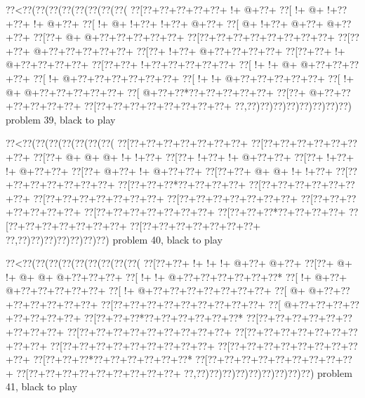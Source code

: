 \vbox{\vbox{\goo
\0??<\0??(\0??(\0??(\0??(\0??(\0??(\0??(\0??(
\0??[\0??+\0??+\0??+\0??+\0??+\- !+\- @+\0??+
\0??[\- !+\- @+\- !+\0??+\0??+\- !+\- @+\0??+
\0??[\- !+\- @+\- !+\0??+\- !+\0??+\- @+\0??+
\0??[\- @+\- !+\0??+\- @+\0??+\- @+\0??+\0??+
\0??[\0??+\- @+\- @+\0??+\0??+\0??+\0??+\0??+
\0??[\0??+\0??+\0??+\0??+\0??+\0??+\0??+\0??+
\0??[\0??+\0??+\- @+\0??+\0??+\0??+\0??+\0??+
\0??[\0??+\- !+\0??+\- @+\0??+\0??+\0??+\0??+
\0??[\0??+\0??+\- !+\- @+\0??+\0??+\0??+\0??+
\0??[\0??+\0??+\- !+\0??+\0??+\0??+\0??+\0??+
\0??[\- !+\- !+\- @+\- @+\0??+\0??+\0??+\0??+
\0??[\- !+\- @+\0??+\0??+\0??+\0??+\0??+\0??+
\0??[\- !+\- !+\- @+\0??+\0??+\0??+\0??+\0??+
\0??[\- !+\- @+\- @+\0??+\0??+\0??+\0??+\0??+
\0??[\- @+\0??+\0??*\0??+\0??+\0??+\0??+\0??+
\0??[\0??+\- @+\0??+\0??+\0??+\0??+\0??+\0??+
\0??[\0??+\0??+\0??+\0??+\0??+\0??+\0??+\0??+
\0??,\0??)\0??)\0??)\0??)\0??)\0??)\0??)\0??)
}
\hfil problem 39, black to play\hfil\break
}

\vbox{\vbox{\goo
\0??<\0??(\0??(\0??(\0??(\0??(\0??(\0??(
\0??[\0??+\0??+\0??+\0??+\0??+\0??+\0??+
\0??[\0??+\0??+\0??+\0??+\0??+\0??+\0??+
\0??[\0??+\- @+\- @+\- @+\- !+\- !+\0??+
\0??[\0??+\- !+\0??+\- !+\- @+\0??+\0??+
\0??[\0??+\- !+\0??+\- !+\- @+\0??+\0??+
\0??[\0??+\- @+\0??+\- !+\- @+\0??+\0??+
\0??[\0??+\0??+\- @+\- @+\- !+\- !+\0??+
\0??[\0??+\0??+\0??+\0??+\0??+\0??+\0??+
\0??[\0??+\0??+\0??*\0??+\0??+\0??+\0??+
\0??[\0??+\0??+\0??+\0??+\0??+\0??+\0??+
\0??[\0??+\0??+\0??+\0??+\0??+\0??+\0??+
\0??[\0??+\0??+\0??+\0??+\0??+\0??+\0??+
\0??[\0??+\0??+\0??+\0??+\0??+\0??+\0??+
\0??[\0??+\0??+\0??+\0??+\0??+\0??+\0??+
\0??[\0??+\0??+\0??*\0??+\0??+\0??+\0??+
\0??[\0??+\0??+\0??+\0??+\0??+\0??+\0??+
\0??[\0??+\0??+\0??+\0??+\0??+\0??+\0??+
\0??,\0??)\0??)\0??)\0??)\0??)\0??)\0??)
}
\hfil problem 40, black to play\hfil\break
}

\vbox{\vbox{\goo
\0??<\0??(\0??(\0??(\0??(\0??(\0??(\0??(\0??(\0??(
\0??[\0??+\0??+\- !+\- !+\- !+\- @+\0??+\- @+\0??+
\0??[\0??+\- @+\- !+\- @+\- @+\- @+\0??+\0??+\0??+
\0??[\- !+\- !+\- @+\0??+\0??+\0??+\0??+\0??+\0??*
\0??[\- !+\- @+\0??+\- @+\0??+\0??+\0??+\0??+\0??+
\0??[\- !+\- @+\0??+\0??+\0??+\0??+\0??+\0??+\0??+
\0??[\- @+\- @+\0??+\0??+\0??+\0??+\0??+\0??+\0??+
\0??[\0??+\0??+\0??+\0??+\0??+\0??+\0??+\0??+\0??+
\0??[\- @+\0??+\0??+\0??+\0??+\0??+\0??+\0??+\0??+
\0??[\0??+\0??+\0??*\0??+\0??+\0??+\0??+\0??+\0??*
\0??[\0??+\0??+\0??+\0??+\0??+\0??+\0??+\0??+\0??+
\0??[\0??+\0??+\0??+\0??+\0??+\0??+\0??+\0??+\0??+
\0??[\0??+\0??+\0??+\0??+\0??+\0??+\0??+\0??+\0??+
\0??[\0??+\0??+\0??+\0??+\0??+\0??+\0??+\0??+\0??+
\0??[\0??+\0??+\0??+\0??+\0??+\0??+\0??+\0??+\0??+
\0??[\0??+\0??+\0??*\0??+\0??+\0??+\0??+\0??+\0??*
\0??[\0??+\0??+\0??+\0??+\0??+\0??+\0??+\0??+\0??+
\0??[\0??+\0??+\0??+\0??+\0??+\0??+\0??+\0??+\0??+
\0??,\0??)\0??)\0??)\0??)\0??)\0??)\0??)\0??)\0??)
}
\hfil problem 41, black to play\hfil\break
}

